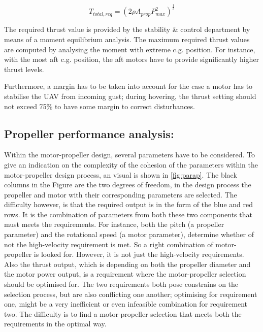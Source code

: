 \begin{equation}
\label{eq:hc}
    T_{total,req} = (2 \rho A_{prop} P_{max}^{2})^{\frac{1}{3}}
\end{equation}

The required thrust value is provided by the stability \& control department by means of a moment equilibrium analysis. The maximum required thrust values are computed by analysing the moment with extreme c.g. position. For instance, with the most aft c.g. position, the aft motors have to provide significantly higher thrust levels. 

Furthermore, a margin has to be taken into account for the case a motor has to stabilise the UAV from incoming gust; during hovering, the thrust setting should not exceed 75\% to have some margin to correct disturbances.\\

\subsection{Propeller performance analysis:}

Within the motor-propeller design, several parameters have to be considered. To give an indication on the complexity of the cohesion of the parameters within the motor-propeller design process, an visual is shown in \autoref{fig:parap}. The black columns in the Figure are the two degrees of freedom, in the design process the propeller and motor with their corresponding parameters are selected. The difficulty however, is that the required output is in the form of the blue and red rows. It is the combination of parameters from both these two components that must meets the requirements. For instance, both the pitch (a propeller parameter) and the rotational speed (a motor parameter), determine whether of not the high-velocity requirement is met. So a right combination of motor-propeller is looked for. However, it is not just the high-velocity requirements. Also the thrust output, which is depending on both the propeller diameter and the motor power output, is a requirement where the motor-propeller selection should be optimised for. The two requirements both pose constrains on the selection process, but are also conflicting one another; optimising for requirement one, might be a very inefficient or even infeasible combination for requirement two. The difficulty is to find a motor-propeller selection that meets both the requirements in the optimal way.

